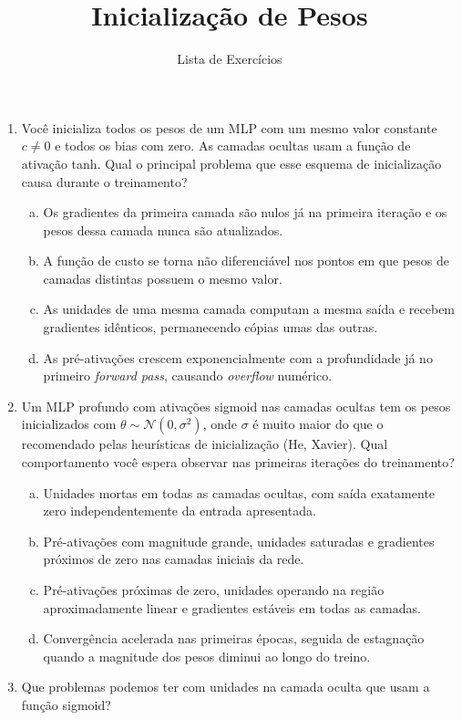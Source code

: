 \documentclass{dlproblemset}
\title{Inicialização de Pesos}
\subtitle{Lista de Exercícios}
\begin{document}
\begin{enumerate}[1)]

    \item Você inicializa todos os pesos de um MLP com um mesmo valor constante $c \neq 0$ e todos os bias com zero. As camadas ocultas usam a função de ativação tanh. Qual o principal problema que esse esquema de inicialização causa durante o treinamento?

    \begin{enumerate}[(a)]
        \item Os gradientes da primeira camada são nulos já na primeira iteração e os pesos dessa camada nunca são atualizados.
        \item A função de custo se torna não diferenciável nos pontos em que pesos de camadas distintas possuem o mesmo valor.
        \item As unidades de uma mesma camada computam a mesma saída e recebem gradientes idênticos, permanecendo cópias umas das outras.
        \item As pré-ativações crescem exponencialmente com a profundidade já no primeiro \textit{forward pass}, causando \textit{overflow} numérico.
    \end{enumerate}

    \item Um MLP profundo com ativações sigmoid nas camadas ocultas tem os pesos inicializados com $\theta \sim \mathcal{N}(0, \sigma^2)$, onde $\sigma$ é muito maior do que o recomendado pelas heurísticas de inicialização (He, Xavier). Qual comportamento você espera observar nas primeiras iterações do treinamento?

    \begin{enumerate}[(a)]
        \item Unidades mortas em todas as camadas ocultas, com saída exatamente zero independentemente da entrada apresentada.
        \item Pré-ativações com magnitude grande, unidades saturadas e gradientes próximos de zero nas camadas iniciais da rede.
        \item Pré-ativações próximas de zero, unidades operando na região aproximadamente linear e gradientes estáveis em todas as camadas.
        \item Convergência acelerada nas primeiras épocas, seguida de estagnação quando a magnitude dos pesos diminui ao longo do treino.
    \end{enumerate}

    \item Que problemas podemos ter com unidades na camada oculta que usam a função sigmoid?


\end{enumerate}
\end{document}
